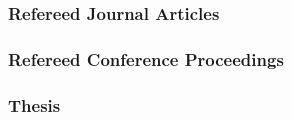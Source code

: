 %

%

\subsubsection*{Refereed Journal Articles}


%

\subsubsection*{Refereed Conference Proceedings}


%







%

\subsubsection*{Thesis}

